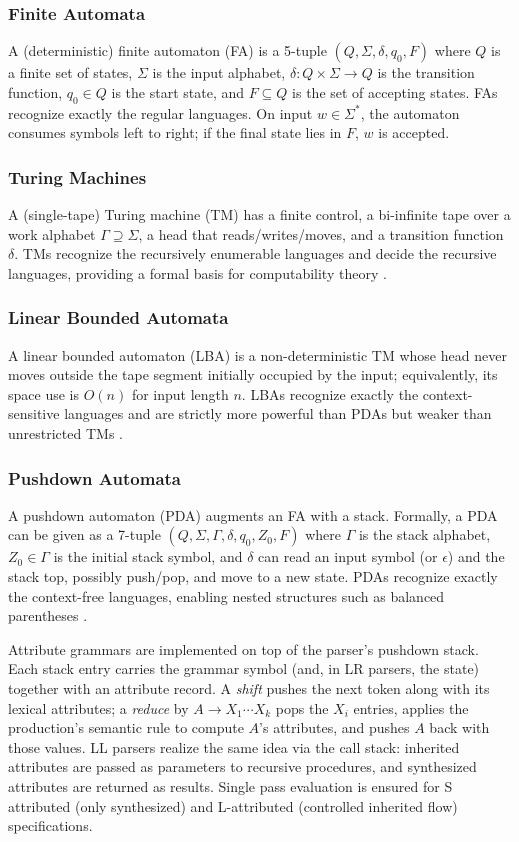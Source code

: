 \subsubsection{Finite Automata}
A (deterministic) finite automaton (FA) is a 5-tuple $(Q,\Sigma,\delta,q_0,F)$ where $Q$ is a finite set of states, $\Sigma$ is the input alphabet, 
$\delta: Q \times \Sigma \to Q$ is the transition function, $q_0 \in Q$ is the start state, and $F \subseteq Q$ is the set of accepting states. 
FAs recognize exactly the regular languages. On input $w \in \Sigma^*$, the automaton consumes symbols left to right; if the final state lies in $F$, $w$ 
is accepted.

\subsubsection{Turing Machines}
A (single-tape) Turing machine (TM) has a finite control, a bi-infinite tape over a work alphabet $\Gamma \supseteq \Sigma$, a head that reads/writes/moves,
 and a transition function $\delta$. TMs recognize the recursively enumerable languages and decide the recursive languages, providing a formal basis for 
 computability theory \cite{cit5}.

\subsubsection{Linear Bounded Automata}
A linear bounded automaton (LBA) is a non-deterministic TM whose head never moves outside the tape segment initially occupied by the input; equivalently, 
its space use is $O(n)$ for input length $n$. LBAs recognize exactly the context-sensitive languages and are strictly more powerful than PDAs but weaker 
than unrestricted TMs \cite{cit5}.

\subsubsection{Pushdown Automata}
A pushdown automaton (PDA) augments an FA with a stack. Formally, a PDA can be given as a 7-tuple $(Q,\Sigma,\Gamma,\delta,q_0,Z_0,F)$ where $\Gamma$ is 
the stack alphabet, $Z_0 \in \Gamma$ is the initial stack symbol, and $\delta$ can read an input symbol (or $\epsilon$) and the stack top, possibly push/pop,
and move to a new state. PDAs recognize exactly the context-free languages, enabling nested structures such as balanced parentheses \cite{cit5}.

Attribute grammars are implemented on top of the parser's pushdown stack. Each stack entry carries the grammar symbol (and, in LR parsers, the state) 
together with an attribute record. A \emph{shift} pushes the next token along with its lexical attributes; a \emph{reduce} by \(A \rightarrow X_1\cdots X_k\)
 pops the \(X_i\) entries, applies the production's semantic rule to compute \(A\)'s attributes, and pushes \(A\) back with those values. LL parsers 
 realize the same idea via the call stack: inherited attributes are passed as parameters to recursive procedures, and synthesized attributes are returned 
 as results. Single pass evaluation is ensured for S attributed (only synthesized) and L-attributed (controlled inherited flow) specifications.

